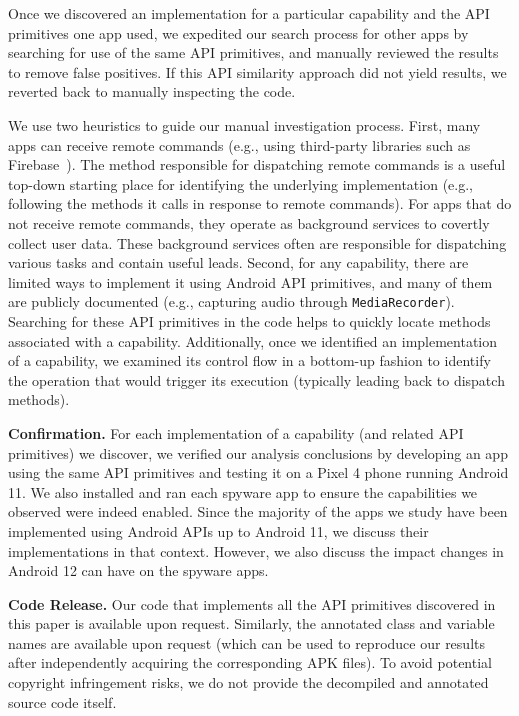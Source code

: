 \documentclass[sigconf,balance=false]{acmart}
\begin{document}
Once we discovered an implementation for a particular capability and
the API primitives one app used, we expedited our search process
for other apps by searching for use of the same API primitives, and manually
reviewed the results to remove false positives. If this API similarity
approach did not yield results, we reverted back to manually
inspecting the code.

We use two heuristics to guide our manual investigation process.
First, many apps can receive remote commands (e.g., using third-party
libraries such as Firebase~\cite{Firebase21:online}).  The method
responsible for dispatching remote commands is a useful top-down
starting place for identifying the underlying implementation (e.g.,
following the methods it calls in response to remote commands).  For
apps that do not receive remote commands, they operate as background
services to covertly collect user data. These background services
often are responsible for dispatching various tasks and contain useful
leads. Second, for any capability, there are limited ways to implement
it using Android API primitives, and many of them are publicly
documented (e.g., capturing audio through \texttt{MediaRecorder}). Searching for these API primitives in the code helps to
quickly locate methods associated with a capability. Additionally,
once we identified an implementation of a capability, we examined its
control flow in a bottom-up fashion to identify the operation that
would trigger its execution (typically leading back to dispatch
methods).

\textbf{Confirmation.} For each implementation of a capability (and
related API primitives) we discover, we verified our analysis conclusions
by developing an app using the same API primitives and
testing it on a Pixel 4 phone running Android 11. We also installed and ran each spyware app to ensure the capabilities we observed were indeed enabled.
Since the majority of the apps we
study have been implemented using Android APIs up to Android 11, we
discuss their implementations in that context. However, we also
discuss the impact changes in Android 12 can have on the spyware apps.

\textbf{Code Release.}  Our code that implements all the API
primitives discovered in this paper is available upon
request. Similarly, the annotated class and variable names are
available upon request (which can be used to reproduce our results
after independently acquiring the corresponding APK files). To avoid
potential copyright infringement risks, we do not provide the
decompiled and annotated source code itself.
\end{document}
